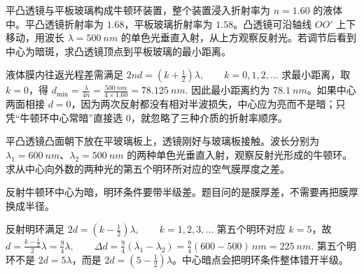 \documentclass[lang=cn,11pt]{elegantbook}
\begin{document}
\begin{exercise}
平凸透镜与平板玻璃构成牛顿环装置，整个装置浸入折射率为 \(n=\num{1.60}\) 的液体中。平凸透镜折射率为 \(\num{1.68}\)，平板玻璃折射率为 \(\num{1.58}\)。凸透镜可沿轴线 \(OO'\) 上下移动，用波长 \(\lambda=\SI{500}{nm}\) 的单色光垂直入射，从上方观察反射光。若调节后看到中心为暗斑，求凸透镜顶点到平板玻璃的最小距离。

\begin{center}
\end{center}
\end{exercise}

\begin{solution}
液体膜内往返光程差需满足
 \(2nd=\left(k+\frac12\right)\lambda,\qquad k=0,1,2,\dots\) 
求最小距离，取 \(k=0\)，得
 \(d_{\min}=\frac{\lambda}{4n} =\frac{\SI{500}{nm}}{4\times1.60} =\SI{78.125}{nm}.\) 
因此最小距离约为 \(\SI{78.1}{nm}\)。如果中心两面相接 \(d=0\)，因为两次反射都没有相对半波损失，中心应为亮而不是暗；只凭“牛顿环中心常暗”直接选 \(0\)，就忽略了三种介质的折射率顺序。
\end{solution}


\begin{exercise}[两种波长第五个牛顿环明环对应膜厚差]
平凸透镜凸面朝下放在平玻璃板上，透镜刚好与玻璃板接触。波长分别为 \(\lambda_1=\SI{600}{nm}\)、\(\lambda_2=\SI{500}{nm}\) 的两种单色光垂直入射，观察反射光形成的牛顿环。求从中心向外数的两种光的第五个明环所对应的空气膜厚度之差。
\end{exercise}

\begin{solution}
反射牛顿环中心为暗，明环条件要带半级差。题目问的是膜厚差，不需要再把膜厚换成半径。

反射明环满足
 \(2d=\left(k-\frac12\right)\lambda,\qquad k=1,2,3,\dots\) 
第五个明环对应 \(k=5\)，故
 \(d=\frac{k-\frac12}{2}\lambda =\frac{9}{4}\lambda,\qquad \Delta d=\frac94(\lambda_1-\lambda_2) =\frac94(600-500)\,\si{nm} =\SI{225}{nm}.\) 
第五个明环不是 \(2d=5\lambda\)，而是 \(2d=(5-\frac12)\lambda\)。中心暗点会把明环条件整体错开半级。
\end{solution}
\end{document}
